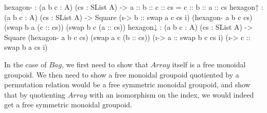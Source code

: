 \documentclass{article}
\newenvironment{code}{\verbatim}{\endverbatim}
\begin{document}
\begin{code}
  hexagon- : (a b c : A) (cs : SList A)
           -> a :: b :: c :: cs = c :: b :: a :: cs
  hexagon↑ : (a b c : A) (cs : SList A)
           -> Square (\i -> b :: swap a c cs i) (hexagon- a b c cs)
                     (swap b a (c :: cs)) (swap b c (a :: cs))
  hexagon↓ : (a b c : A) (cs : SList A)
           -> Square (hexagon- a b c cs) (swap a c (b :: cs))
                     (\i -> a :: swap b c cs i) (\i -> c :: swap b a cs i)
\end{code}


In the case of $Bag$, we first need to show that $Array$ itself is a free monoidal groupoid. We then need to show a free
monoidal groupoid quotiented by a permutation relation would be a free symmetric monoidal groupoid, and show that by quotienting
$Array$ with an isomorphism on the index, we would indeed get a free symmetric monoidal groupoid.

\printbibliography
\end{document}
